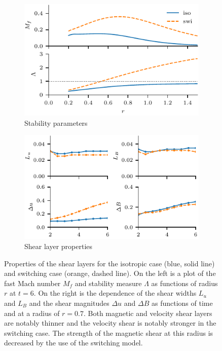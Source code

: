 \begin{figure}[t]
  \centering
    \begin{subfigure}{0.49\textwidth}
      \includegraphics[width=\linewidth]{v-4r-4_mach_t_6}
      \caption{Stability parameters}%
      \label{fig:v-4r-4_mach_t_6}
    \end{subfigure}
    \hfill
    \begin{subfigure}{0.49\textwidth}
      \includegraphics[width=\linewidth]{v-4r-4_layers_with_time}
      \caption{Shear layer properties}
      \label{fig:v-4r-4_layers_with_time}
    \end{subfigure}
\caption{Properties of the shear layers for the isotropic case (blue, solid line) and switching case (orange, dashed line). On the left is a plot of the fast Mach number $M_f$ and stability measure $\Lambda$ as functions of radius $r$ at $t=6$. On the right is the dependence of the shear widths $L_u$ and $L_B$ and the shear magnitudes $\Delta u$ and $\Delta B$ as functions of time and at a radius of $r=0.7$. Both magnetic and velocity shear layers are notably thinner and the velocity shear is notably stronger in the switching case. The strength of the magnetic shear at this radius is decreased by the use of the switching model.}
\label{fig:v-4r-4_layers}%
\end{figure}

